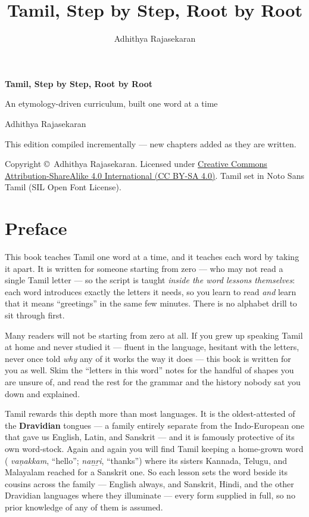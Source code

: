 \documentclass[11pt,twoside]{book}
\title{\Huge Tamil, Step by Step, Root by Root}
\author{Adhithya Rajasekaran}
\date{}
\begin{document}
\frontmatter

\begin{titlepage}
  \centering
  \vspace*{3cm}
  {\Huge\bfseries Tamil, Step by Step, Root by Root\par}
  \vspace{1cm}
  {\Large An etymology-driven curriculum, built one word at a time\par}
  \vspace{1.5cm}
  {\large Adhithya Rajasekaran\par}
  \vfill
  {\large This edition compiled incrementally --- new chapters added as they
  are written.\par}
  \vspace{2cm}
  {\normalsize
    Copyright \copyright\ Adhithya Rajasekaran. Licensed under
    \href{https://creativecommons.org/licenses/by-sa/4.0/}%
    {Creative Commons Attribution-ShareAlike 4.0 International (CC BY-SA 4.0)}.
    Tamil set in Noto Sans Tamil (SIL Open Font License).\par
  }
\end{titlepage}

\chapter*{Preface}

This book teaches Tamil one word at a time, and it teaches each word by taking
it apart. It is written for someone starting from zero --- who may not read a
single Tamil letter --- so the script
is taught \emph{inside the word lessons themselves}: each word introduces
exactly the letters it needs, so you learn to read  \emph{and}
learn that it means ``greetings'' in the same few minutes. There is no alphabet
drill to sit through first.

Many readers will not be starting from zero at all. If you grew up speaking
Tamil at home and never studied it --- fluent in the language, hesitant with the
letters, never once told \emph{why} any of it works the way it does --- this
book is written for you as well. Skim the ``letters in this word'' notes for the
handful of shapes you are unsure of, and read the rest for the grammar and the
history nobody sat you down and explained.

Tamil rewards this depth more than most languages. It is the oldest-attested of
the \textbf{Dravidian} tongues --- a family entirely separate from the
Indo-European one that gave us English, Latin, and Sanskrit --- and it is
famously protective of its own word-stock. Again and again you will find Tamil
keeping a home-grown word ( \emph{vaṇakkam}, ``hello'';
 \emph{naṉṟi}, ``thanks'') where its sisters Kannada, Telugu, and
Malayalam reached for a Sanskrit one. So each lesson sets the word beside its
cousins across the family --- English always, and Sanskrit, Hindi, and the
other Dravidian languages where they illuminate --- every form supplied in
full, so no prior knowledge of any of them is assumed.
\end{document}
